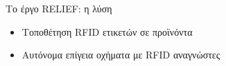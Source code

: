 \begin{frame}{Το έργο RELIEF: η λύση}

 \begin{itemize}
   \item Τοποθέτηση RFID ετικετών σε προϊνόντα
   \item Αυτόνομα επίγεια οχήματα με RFID αναγνώστες
 \end{itemize}

\end{frame}
